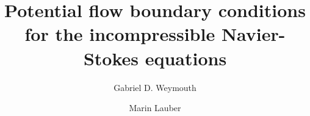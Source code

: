 \documentclass[preprint,12pt]{elsarticle}
\begin{document}
\begin{frontmatter}



\title{Potential flow boundary conditions for the incompressible Navier-Stokes equations}


\author[inst1]{Gabriel D. Weymouth}
\author[inst1]{Marin Lauber}



\end{frontmatter}
\end{document}
